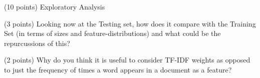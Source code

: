 \documentclass[12pt]{article}
\begin{document}
\begin{question}{(10 points) Exploratory Analysis}
\begin{subquestion}{(3 points) Looking now at the Testing set, how does it compare with the Training Set (in terms of sizes and feature-distributions) and what could be the repurcussions of this?}
\end{subquestion}

\begin{subquestion}{(2 points) Why do you think it is useful to consider TF-IDF weights as opposed to just the frequency of times a word appears in a document as a feature?}






\end{subquestion}



\end{question}


\end{document}

